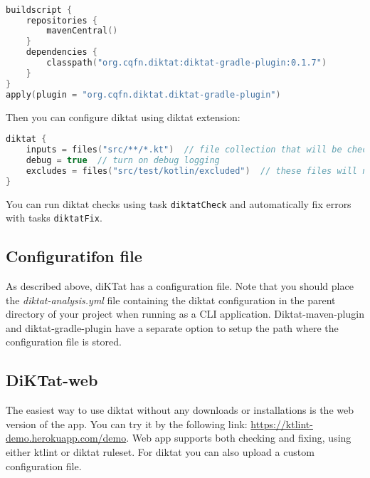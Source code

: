 \begin{lstlisting}[caption={DiKTat with Gradle plugin}, label={lst:gradle1}, language=Kotlin]

buildscript {
    repositories {
        mavenCentral()
    }
    dependencies {
        classpath("org.cqfn.diktat:diktat-gradle-plugin:0.1.7")
    }
}
apply(plugin = "org.cqfn.diktat.diktat-gradle-plugin")
\end{lstlisting}

Then you can configure diktat using diktat extension:

\begin{lstlisting}[caption={DiKTat extension}, label={lst:gradle2}, language=Kotlin]
diktat {
    inputs = files("src/**/*.kt")  // file collection that will be checked by diktat
    debug = true  // turn on debug logging
    excludes = files("src/test/kotlin/excluded")  // these files will not be checked by diktat
}
\end{lstlisting}

You can run diktat checks using task \texttt{diktatCheck} and automatically fix errors with tasks \texttt{diktatFix}.

\subsection{Configuratifon file}
As described above, diKTat has a configuration file. Note that you should place the \textsl{diktat-analysis.yml} file containing the diktat configuration in the parent directory of your project when running as a CLI application. Diktat-maven-plugin and diktat-gradle-plugin have a separate option to setup the path where the configuration file is stored.

\subsection{DiKTat-web}
The easiest way to use diktat without any downloads or installations is the web version of the app. You can try it by the following link: \url{https://ktlint-demo.herokuapp.com/demo}. Web app supports both checking and fixing, using either ktlint or diktat ruleset. For diktat you can also upload a custom configuration file.
